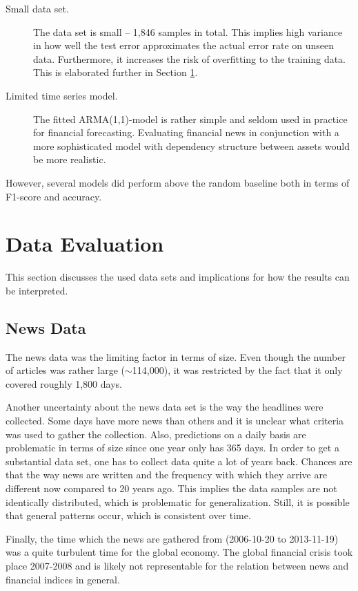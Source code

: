 \begin{description}
    \item[Small data set.] The data set is small -- 1,846 samples in total. This implies high variance in how well the test error approximates the actual error rate on unseen data. Furthermore, it increases the risk of overfitting to the training data. This is elaborated further in Section \ref{sec:disc_data}.
    \item[Limited time series model.] The fitted ARMA(1,1)-model is rather simple and seldom used in practice for financial forecasting. Evaluating financial news in conjunction with a more sophisticated model with dependency structure between assets would be more realistic. 
\end{description}

However, several models did perform above the random baseline both in terms of F1-score and accuracy. 



\section{Data Evaluation}\label{sec:disc_data}
This section discusses the used data sets and implications for how the results can be interpreted. 

\subsection{News Data}\label{sec:news_disc}

The news data was the limiting factor in terms of size. Even though the number of articles was rather large ($\sim$114,000), it was restricted by the fact that it only covered roughly 1,800 days.

Another uncertainty about the news data set is the way the headlines were collected. Some days have more news than others and it is unclear what criteria was used to gather the collection. Also, predictions on a daily basis are problematic in terms of size since one year only has 365 days. In order to get a substantial data set, one has to collect data quite a lot of years back. Chances are that the way news are written and the frequency with which they arrive are different now compared to 20 years ago. This implies the data samples are not identically distributed, which is problematic for generalization. Still, it is possible that general patterns occur, which is consistent over time. 

Finally, the time which the news are gathered from (2006-10-20 to 2013-11-19) was a quite turbulent time for the global economy. The global financial crisis took place 2007-2008 and is likely not representable for the relation between news and financial indices in general. 

